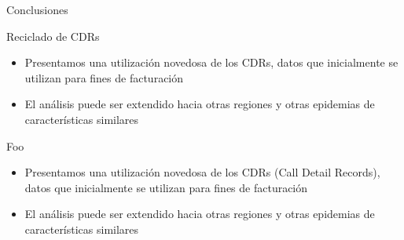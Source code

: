 \documentclass{beamer}
\begin{document}
\begin{frame}{Conclusiones}
	\begin{block}{Reciclado de CDRs }
		\begin{itemize}
			\item Presentamos una utilizaci\'on novedosa de los CDRs, datos que inicialmente se utilizan para fines de facturación
			\item El análisis puede ser extendido hacia otras regiones y otras epidemias de características similares
		\end{itemize}
	\end{block}

	\begin{block}{Foo}
		\begin{itemize}
			\item Presentamos una utilizaci\'on novedosa de los CDRs (Call Detail Records), datos que inicialmente se utilizan para fines de facturación
			\item El análisis puede ser extendido hacia otras regiones y otras epidemias de características similares
		\end{itemize}
	\end{block}

\end{frame}


%
%
%
\end{document}
